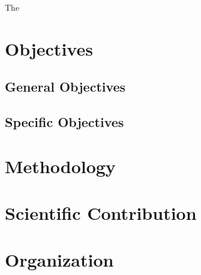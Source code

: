 The \cite{mceliece1978public}
\section{Objectives}
\subsection{General Objectives}
\subsection{Specific Objectives}
\section{Methodology}
\section{Scientific Contribution}
\section{Organization}
